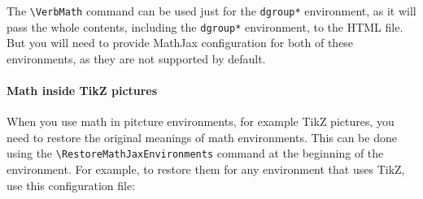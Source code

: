 The \verb|\VerbMath| command can be used just for the \verb|dgroup*| environment, as it will pass the
whole contents, including the \verb|dgroup*| environment, to the HTML file. But you will need to 
provide MathJax configuration for both of these environments, as they are not supported by default.


\paragraph{Math inside TikZ pictures}

When you use math in pitcture environments, for example TikZ pictures, you need to restore the original
meanings of math environments. This can be done using the \verb|\RestoreMathJaxEnvironments| command
at the beginning of the environment. For example, to restore them for any environment that uses TikZ,
use this configuration file:

\begin{texsource}

\EndPreamble
\end{texsource}

